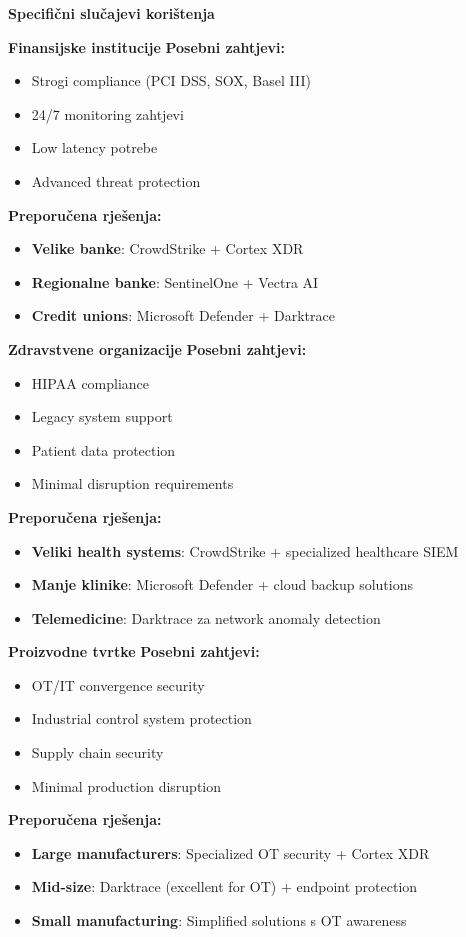\textbf{Specifični slučajevi korištenja}

\textbf{Finansijske institucije}
\textbf{Posebni zahtjevi:}
\begin{itemize}
\item Strogi compliance (PCI DSS, SOX, Basel III)
\item 24/7 monitoring zahtjevi
\item Low latency potrebe
\item Advanced threat protection
\end{itemize}

\textbf{Preporučena rješenja:}
\begin{itemize}
\item \textbf{Velike banke}: CrowdStrike + Cortex XDR
\item \textbf{Regionalne banke}: SentinelOne + Vectra AI
\item \textbf{Credit unions}: Microsoft Defender + Darktrace
\end{itemize}

\textbf{Zdravstvene organizacije}
\textbf{Posebni zahtjevi:}
\begin{itemize}
\item HIPAA compliance
\item Legacy system support
\item Patient data protection
\item Minimal disruption requirements
\end{itemize}

\textbf{Preporučena rješenja:}
\begin{itemize}
\item \textbf{Veliki health systems}: CrowdStrike + specialized healthcare SIEM
\item \textbf{Manje klinike}: Microsoft Defender + cloud backup solutions
\item \textbf{Telemedicine}: Darktrace za network anomaly detection
\end{itemize}

\textbf{Proizvodne tvrtke}
\textbf{Posebni zahtjevi:}
\begin{itemize}
\item OT/IT convergence security
\item Industrial control system protection
\item Supply chain security
\item Minimal production disruption
\end{itemize}

\textbf{Preporučena rješenja:}
\begin{itemize}
\item \textbf{Large manufacturers}: Specialized OT security + Cortex XDR
\item \textbf{Mid-size}: Darktrace (excellent for OT) + endpoint protection
\item \textbf{Small manufacturing}: Simplified solutions s OT awareness
\end{itemize}

